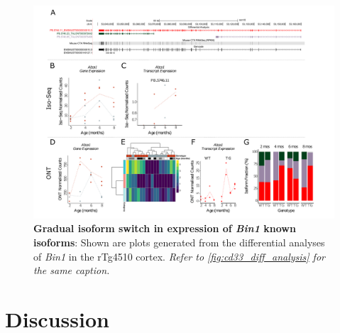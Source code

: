 \begin{landscape}
	\begin{figure}[htp]
		\begin{center}
			\includegraphics[page=6,trim={0 0.5cm 0 1.5cm},scale =0.85]{Figures/TargetGene_DifferentialAnalysis.pdf}
		\end{center}
		\captionsetup{width=1.5\textwidth}
		\caption[Gradual isoform switch in expression of \textit{Bin1} known isoforms]%
		{\textbf{Gradual isoform switch in expression of \textit{Bin1} known isoforms}: Shown are plots generated from the differential analyses of \textit{Bin1} in the rTg4510 cortex. \textit{Refer to \cref{fig:cd33_diff_analysis} for the same caption.}}   
		\label{fig:bin1_diff_analysis}
	\end{figure}
\end{landscape}



\newpage
\section{Discussion}
